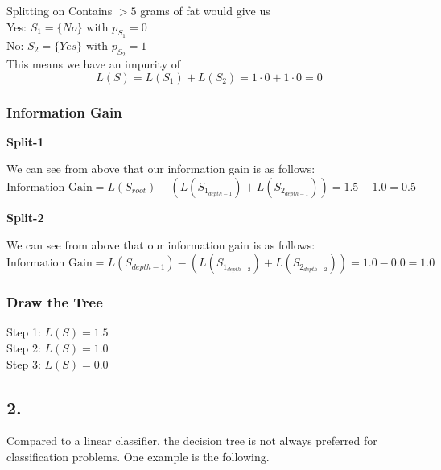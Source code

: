 \documentclass{article}
\begin{document}
Splitting on Contains $> 5$ grams of fat would give us \\
Yes: $S_1 = \{ No \}$ with $p_{S_1} = 0$ \\
No: $S_2 = \{ Yes \}$ with $p_{S_2} = 1$ \\
This means we have an impurity of
\[ L(S) = L(S_1) + L(S_2) = 1 \cdot 0 + 1 \cdot 0 = 0 \]

\subsubsection*{Information Gain}
\noindent \textbf{Split-1}

We can see from above that our information gain is as follows:
\[ \text{Information Gain} = L(S_{root}) - (L(S_{1_{depth-1}}) + L(S_{2_{depth-1}})) =
    1.5 - 1.0 = 0.5 \]

\noindent \textbf{Split-2}

We can see from above that our information gain is as follows:
\[ \text{Information Gain} = L(S_{depth-1}) - (L(S_{1_{depth-2}}) + L(S_{2_{depth-2}})) =
    1.0 - 0.0 = 1.0 \]

\subsubsection*{Draw the Tree}


\vspace{5mm}

\noindent Step 1: $L(S) = 1.5$ \\
Step 2: $L(S) = 1.0$ \\
Step 3: $L(S) = 0.0$ \\

\newpage
\subsection*{2.}
Compared to a linear classifier, the decision tree is not always preferred for
classification problems. One example is the following.
\end{document}
